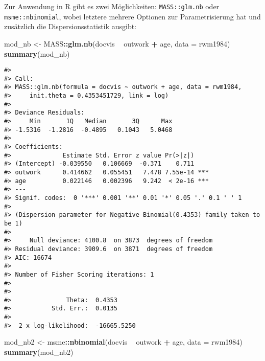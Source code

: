 \documentclass[ngerman,a4paper,]{scrartcl}
\newenvironment{Shaded}{\begin{snugshade}}{\end{snugshade}}
\newcommand{\DataTypeTok}[1]{\textcolor[rgb]{0.13,0.29,0.53}{#1}}
\newcommand{\KeywordTok}[1]{\textcolor[rgb]{0.13,0.29,0.53}{\textbf{#1}}}
\newcommand{\NormalTok}[1]{#1}
\newcommand{\OperatorTok}[1]{\textcolor[rgb]{0.81,0.36,0.00}{\textbf{#1}}}
\newcommand{\StringTok}[1]{\textcolor[rgb]{0.31,0.60,0.02}{#1}}
\theoremstyle{definition}
\theoremstyle{definition}
\theoremstyle{definition}
\theoremstyle{remark}
\begin{document}
Zur Anwendung in R gibt es zwei Möglichkeiten: \texttt{MASS::glm.nb} oder \texttt{msme::nbinomial}, wobei letztere mehrere Optionen zur Parametrisierung hat und zusätzlich die Dispersionsstatistik ausgibt:

\begin{Shaded}
\begin{Highlighting}[]
\NormalTok{mod_nb <-}\StringTok{ }\NormalTok{MASS}\OperatorTok{::}\KeywordTok{glm.nb}\NormalTok{(docvis }\OperatorTok{~}\StringTok{ }\NormalTok{outwork }\OperatorTok{+}\StringTok{ }\NormalTok{age,}
                       \DataTypeTok{data =}\NormalTok{ rwm1984)}
\KeywordTok{summary}\NormalTok{(mod_nb)}
\end{Highlighting}
\end{Shaded}

\begin{verbatim}
#> 
#> Call:
#> MASS::glm.nb(formula = docvis ~ outwork + age, data = rwm1984, 
#>     init.theta = 0.4353451729, link = log)
#> 
#> Deviance Residuals: 
#>     Min       1Q   Median       3Q      Max  
#> -1.5316  -1.2816  -0.4895   0.1043   5.0468  
#> 
#> Coefficients:
#>              Estimate Std. Error z value Pr(>|z|)    
#> (Intercept) -0.039550   0.106669  -0.371    0.711    
#> outwork      0.414662   0.055451   7.478 7.55e-14 ***
#> age          0.022146   0.002396   9.242  < 2e-16 ***
#> ---
#> Signif. codes:  0 '***' 0.001 '**' 0.01 '*' 0.05 '.' 0.1 ' ' 1
#> 
#> (Dispersion parameter for Negative Binomial(0.4353) family taken to be 1)
#> 
#>     Null deviance: 4100.8  on 3873  degrees of freedom
#> Residual deviance: 3909.6  on 3871  degrees of freedom
#> AIC: 16674
#> 
#> Number of Fisher Scoring iterations: 1
#> 
#> 
#>               Theta:  0.4353 
#>           Std. Err.:  0.0135 
#> 
#>  2 x log-likelihood:  -16665.5250
\end{verbatim}

\begin{Shaded}
\begin{Highlighting}[]
\NormalTok{mod_nb2 <-}\StringTok{ }\NormalTok{msme}\OperatorTok{::}\KeywordTok{nbinomial}\NormalTok{(docvis }\OperatorTok{~}\StringTok{ }\NormalTok{outwork }\OperatorTok{+}\StringTok{ }\NormalTok{age,}
                           \DataTypeTok{data =}\NormalTok{ rwm1984)}
\KeywordTok{summary}\NormalTok{(mod_nb2)}
\end{Highlighting}
\end{Shaded}
\end{document}
